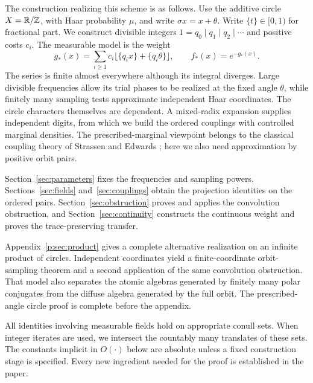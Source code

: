 The construction realizing this scheme is as follows.
Use the additive circle $X=\mathbb R/\mathbb Z$, with Haar probability $\mu$, and write
$\sigma x=x+\theta$.  Write $\{t\}\in[0,1)$ for fractional part.
We construct divisible integers
$1=q_0\mid q_1\mid q_2\mid\cdots$ and positive costs $c_i$.
The measurable model is the weight
\[
 g_*(x)=\sum_{i\ge1}c_i\lfloor\{q_ix\}+\{q_i\theta\}\rfloor,
 \qquad f_*(x)=e^{-g_*(x)}.
\]
The series is finite almost everywhere although its integral diverges.
Large divisible frequencies allow its trial phases to be realized at the
fixed angle $\theta$, while finitely many sampling tests approximate
independent Haar coordinates.  The circle characters themselves are
dependent.  A mixed-radix expansion supplies independent digits, from
which we build the ordered couplings with controlled marginal densities.
The prescribed-marginal viewpoint belongs to the classical coupling
theory of Strassen and Edwards \citep{Strassen1965,Edwards1978}; here
we also need approximation by positive orbit pairs.

Section~\ref{sec:parameters} fixes the frequencies and sampling powers.
Sections~\ref{sec:fields} and~\ref{sec:couplings} obtain the projection
identities on the ordered pairs.  Section~\ref{sec:obstruction} proves
and applies the convolution obstruction, and
Section~\ref{sec:continuity} constructs the continuous weight and proves
the trace-preserving transfer.

Appendix~\ref{p:sec:product} gives a complete alternative realization on
an infinite product of circles.  Independent coordinates yield a
finite-coordinate orbit-sampling theorem and a second application of the
same convolution obstruction.  That model also separates the atomic
algebras generated by finitely many polar conjugates from the diffuse
algebra generated by the full orbit.  The prescribed-angle circle proof
is complete before the appendix.



All identities involving measurable fields hold on appropriate conull
sets.  When integer iterates are used, we intersect the countably many
translates of these sets.  The constants implicit in $O(\cdot)$ below
are absolute unless a fixed construction stage is specified.  Every new
ingredient needed for the proof is established in the paper.
